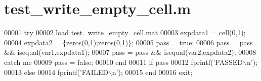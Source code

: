 \hypertarget{test__write__empty__cell_8m_source}{}\section{test\+\_\+write\+\_\+empty\+\_\+cell.\+m}
\label{test__write__empty__cell_8m_source}

\begin{DoxyCode}
00001 \textcolor{keywordflow}{try}
00002     load test\_write\_empty\_cell.mat
00003     expdata1 = cell(0,1);
00004     expdata2 = \{zeros(0,1);zeros(0,1)\};
00005     pass = \textcolor{keyword}{true};
00006     pass = pass && isequal(var1,expdata1);
00007     pass = pass && isequal(var2,expdata2);
00008 \textcolor{keywordflow}{catch} me
00009     pass = \textcolor{keyword}{false};
00010 end
00011 \textcolor{keywordflow}{if} pass
00012     fprintf(\textcolor{stringliteral}{'PASSED\(\backslash\)n'});
00013 \textcolor{keywordflow}{else}
00014     fprintf(\textcolor{stringliteral}{'FAILED\(\backslash\)n'});
00015 end
00016 exit;
\end{DoxyCode}
